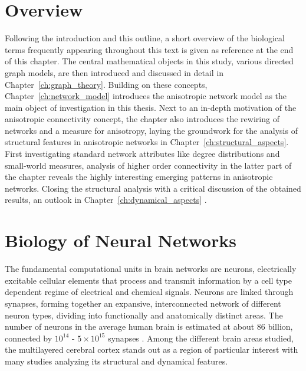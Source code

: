 \section{Overview}\label{sec:all_overview}

Following the introduction and this outline, a short overview of the
biological terms frequently appearing throughout this text is given as
reference at the end of this chapter. The central mathematical objects
in this study, various directed graph models, are then introduced and
discussed in detail in Chapter~\ref{ch:graph_theory}. Building on
these concepts, Chapter~\ref{ch:network_model} introduces the
anisotropic network model as the main object of investigation in this
thesis. Next to an in-depth motivation of the anisotropic connectivity
concept, the chapter also introduces the rewiring of networks and a
measure for anisotropy, laying the groundwork for the analysis of
structural features in anisotropic networks in
Chapter~\ref{ch:structural_aspects}. First investigating standard
network attributes like degree distributions and small-world measures,
analysis of higher order connectivity in the latter part of the
chapter reveals the highly interesting emerging patterns in
anisotropic networks. Closing the structural analysis with a critical
discussion of the obtained results, an outlook in
Chapter~\ref{ch:dynamical_aspects} . 



\section{Biology of Neural Networks}\label{sec:Biology} 



The fundamental computational units in brain networks are
neurons, electrically excitable cellular elements that
process and transmit information by a cell type dependent regime of
electrical and chemical signals. Neurons are linked through
synapses, forming together an expansive, interconnected
network of different neuron types, dividing into functionally and
anatomically distinct areas. The number of neurons in the average
human brain is estimated at about 86 billion, connected by
$10^{14}$ - $5\times10^{15}$ synapses \parencite{Herculano2009,
  Drachman2005}. Among the different brain areas studied, the
multilayered cerebral cortex stands out as a region of
particular interest with many studies analyzing its structural and
dynamical features.

